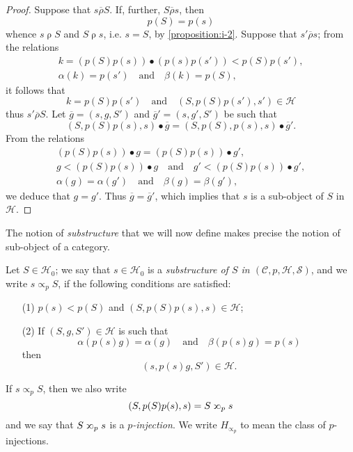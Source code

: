 \documentclass[a4paper,fleqn]{article}
\theoremstyle{plain}
\theoremstyle{definition}
\newenvironment{definition}[1]
  {\renewcommand\theinnerdefinition{#1}\innerdefinition}
  {\endinnerdefinition}
\newcommand{\oldpage}[1]{{\marginpar{\footnotesize$\bigg\vert$\,\,\,\,\textit{p.~#1}}}}
\newcommand{\textand}{\quad\text{and}\quad}
\newcommand{\CC}{\mathcal{C}}
\newcommand{\HH}{\mathcal{H}}
\renewcommand{\SS}{\mathcal{S}}
\newcommand{\relrho}{\mathrel{\rho}}
\newcommand{\relrhobar}{\mathrel{\overline{\rho}}}
\newcommand{\subs}{\mathrel{\propto}}
\newcommand{\sups}{\mathrel{\reflectbox{$\propto$}}}
\begin{document}
\begin{proof}
  Suppose that $s\relrhobar S$.
  If, further, $S\relrhobar s$, then
  \[
    p(S)=p(s)
  \]
  whence $s\relrho S$ and $S\relrho s$, i.e. $s=S$, by \cref{proposition:i-2}.
  Suppose that $s'\relrhobar s$;
  from the relations
  \[
    \begin{gathered}
      k = (p(S)p(s))\bullet(p(s)p(s'))
      < p(S)p(s'),
    \\\alpha(k)=p(s')
      \textand
      \beta(k)=p(S),
    \end{gathered}
  \]
  it follows that
  \[
    k=p(S)p(s')
    \textand
    (S,p(S)p(s'),s')\in\HH
  \]
  thus $s'\relrhobar S$.
  \oldpage{360}
  Let $\overline{g}=(s,g,S')$ and $\overline{g}'=(s,g',S')$ be such that
  \[
    (S,p(S)p(s),s)\bullet\overline{g}
    = (S,p(S),p(s),s)\bullet\overline{g}'.
  \]
  From the relations
  \[
    \begin{gathered}
      (p(S)p(s))\bullet g = (p(S)p(s))\bullet g',
    \\g < (p(S)p(s))\bullet g
      \textand
      g' < (p(S)p(s))\bullet g',
    \\\alpha(g)=\alpha(g')
      \textand
      \beta(g)=\beta(g'),
    \end{gathered}
  \]
  we deduce that $g=g'$.
  Thus $\overline{g}=\overline{g}'$, which implies that $s$ is a sub-object of $S$ in $\HH$.
\end{proof}

The notion of \emph{substructure} that we will now define makes precise the notion of sub-object of a category.

\begin{definition}{7}
\label{definition:i-7}
  Let $S\in\HH_0$;
  we say that $s\in\HH_0$ is a \emph{substructure of $S$ in $(\CC,p,\HH,\SS)$}, and we write $s\subs_p S$, if the following conditions are satisfied:
  \begin{enumerate}
    \item[\normalfont(1)]
      $p(s)<p(S)$ and $(S,p(S)p(s),s)\in\HH$;
    \item[\normalfont(2)]
      If $(S,g,S')\in\HH$ is such that
      \[
        \alpha(p(s)g)=\alpha(g)
        \textand
        \beta(p(s)g)=p(s)
      \]
      then
      \[
        (s,p(s)g,S')\in\HH.
      \]
  \end{enumerate}
  If $s\subs_pS$, then we also write
  \[
    (S,p(S)p(s),s)
    = S\sups_p s
  \]
  and we say that $S\sups_p s$ is a \emph{$p$-injection}.
  We write $H_{\subs_p}$ to mean the class of $p$-injections.
\end{definition}
\end{document}
